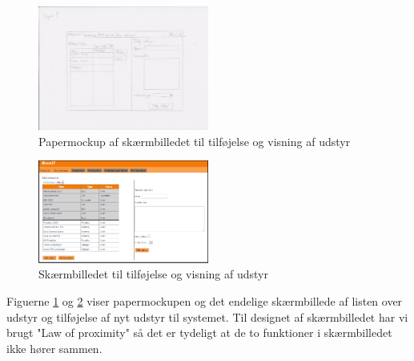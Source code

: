 \begin{figure}[h!]
  \centering
    \includegraphics[width=0.5\textwidth]{Appendix/GUI-Prototype/PaperMockup/UdstyrsListe}
  \caption{Papermockup af skærmbilledet til tilføjelse og visning af udstyr}
\label{Design_G_Development_EquipmentList}
\end{figure}

\begin{figure}[h!]
  \centering
    \includegraphics[width=0.5\textwidth]{Appendix/GUI-Prototype/DigitalMockup/UdstyrsListe}
  \caption{Skærmbilledet til tilføjelse og visning af udstyr}
\label{Design_G_Development_EquipmentList_Final}
\end{figure}

Figuerne \ref{Design_G_Development_EquipmentList} og \ref{Design_G_Development_EquipmentList_Final} viser papermockupen og det endelige skærmbillede af listen over udstyr og tilføjelse af nyt udstyr til systemet. Til designet af skærmbilledet har vi brugt "Law of proximity" så det er tydeligt at de to funktioner i skærmbilledet ikke hører sammen.